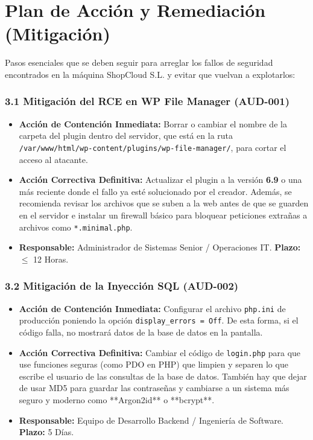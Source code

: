 \documentclass[11pt,a4paper]{report}
\begin{document}
\newpage
\chapter{Plan de Acción y Remediación (Mitigación)}
Pasos esenciales que se deben seguir para arreglar los fallos de seguridad encontrados en la máquina ShopCloud S.L. y evitar que vuelvan a explotarlos:

\subsection*{3.1 Mitigación del RCE en WP File Manager (AUD-001)}
\begin{itemize}
    \item \textbf{Acción de Contención Inmediata:} Borrar o cambiar el nombre de la carpeta del plugin dentro del servidor, que está en la ruta \texttt{/var/www/html/wp-content/plugins/wp-file-manager/}, para cortar el acceso al atacante.
    \item \textbf{Acción Correctiva Definitiva:} Actualizar el plugin a la versión \textbf{6.9} o una más reciente donde el fallo ya esté solucionado por el creador. Además, se recomienda revisar los archivos que se suben a la web antes de que se guarden en el servidor e instalar un firewall básico para bloquear peticiones extrañas a archivos como \texttt{*.minimal.php}.
    \item \textbf{Responsable:} Administrador de Sistemas Senior / Operaciones IT. \textbf{Plazo:} $\le$ 12 Horas.
\end{itemize}

\subsection*{3.2 Mitigación de la Inyección SQL (AUD-002)}
\begin{itemize}
    \item \textbf{Acción de Contención Inmediata:} Configurar el archivo \texttt{php.ini} de producción poniendo la opción \texttt{display\_errors = Off}. De esta forma, si el código falla, no mostrará datos de la base de datos en la pantalla.
    \item \textbf{Acción Correctiva Definitiva:} Cambiar el código de \texttt{login.php} para que use funciones seguras (como PDO en PHP) que limpien y separen lo que escribe el usuario de las consultas de la base de datos. También hay que dejar de usar MD5 para guardar las contraseñas y cambiarse a un sistema más seguro y moderno como **Argon2id** o **bcrypt**.
    \item \textbf{Responsable:} Equipo de Desarrollo Backend / Ingeniería de Software. \textbf{Plazo:} 5 Días.
\end{itemize}
\end{document}
